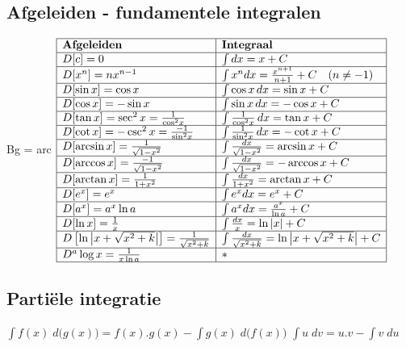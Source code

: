 \documentclass[a5paper]{article}
\begin{document}
\subsection{Afgeleiden - fundamentele integralen}
\vspace{2mm}
Bg = arc
\vspace{2mm}
\newline
\fontsize{14pt}{15pt}\selectfont
$
\begin{array}{|l|l|}
\hline
\textbf{Afgeleiden} & \textbf{Integraal} \\
\hline
D[c] = 0 & \int dx = x + C \\
\hline
D[x^n] = n x^{n-1} & \int x^n dx = \frac{x^{n+1}}{n+1} + C \quad (n \neq -1) \\
\hline
D[\sin x] = \cos x & \int \cos x \, dx = \sin x + C \\
\hline
D[\cos x] = -\sin x & \int \sin x \, dx = -\cos x + C \\
\hline
D[\tan x] = \sec^2 x = \frac{1}{{{{\cos }^2}x}} & \int \frac{1}{{{{\cos }^2}x}} \, dx = \tan x + C \\
\hline
D[\cot x] = -\csc^2 x = \frac{-1}{{{{\sin }^2}x}} & \int \frac{1}{{{{\sin }^2}x}} \, dx = -\cot x + C \\
\hline
D[\arcsin x] = \frac{1}{\sqrt{1-x^2}} & \int \frac{dx}{\sqrt{1-x^2}} = \arcsin x + C \\
\hline
D[\arccos x] = \frac{-1}{\sqrt{1-x^2}} & \int \frac{dx}{\sqrt{1-x^2}} = -\arccos x + C \\
\hline
D[\arctan x] = \frac{1}{1+x^2} & \int \frac{dx}{1+x^2} = \arctan x + C \\
\hline
D[e^x] = e^x & \int e^x dx = e^x + C \\
\hline
D[a^x] = a^x \ln a & \int a^x dx = \frac{a^x}{\ln a} + C \\
\hline
D[\ln x] = \frac{1}{x} & \int \frac{dx}{x} = \ln |x| + C \\
\hline
D\left[\ln \left| x + \sqrt{x^2 + k} \right| \right] = \frac{1}{\sqrt{x^2 + k}} & \int \frac{dx}{\sqrt{x^2 + k}} = \ln \left| x + \sqrt{x^2 + k} \right| + C \\
\hline
D{}^a\log x = \frac{1}{{x\ln a}} & * \\
\hline
\end{array}
$
\normalsize

\vspace{2mm}

\subsection{Partiële integratie}
\vspace{2mm}
\fontsize{14pt}{15pt}\selectfont
$\int {f(x)\;d(g(x)} ) = f(x).g(x) - \int {g(x)\;d(f(x)} )$
\vspace{2mm}
\newline
$\int {u\;dv}  = u.v - \int {v\;du} $
\normalsize
\end{document}
